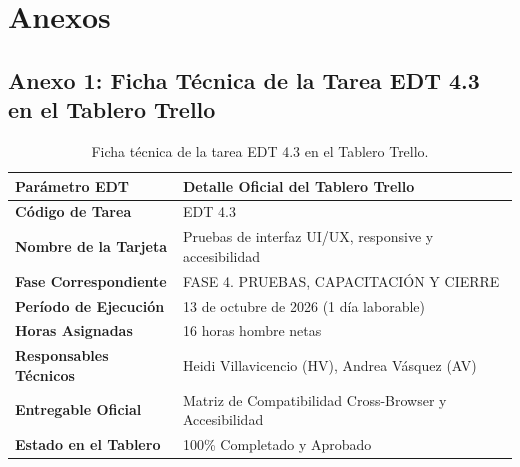 \documentclass[12pt,a4paper]{article}
\begin{document}
\vspace{0.4cm}

\section{Anexos}

\subsection*{Anexo 1: Ficha Técnica de la Tarea EDT 4.3 en el Tablero Trello}
\begin{table}[H]
\centering
\small
\renewcommand{\arraystretch}{1.2}
\begin{tabularx}{\textwidth}{|>{\bfseries}m{3.5cm}|X|}
\hline
\rowcolor{tableheader}
\textbf{Parámetro EDT} & \textbf{Detalle Oficial del Tablero Trello} \\
\hline
Código de Tarea & EDT 4.3 \\
\hline
Nombre de la Tarjeta & Pruebas de interfaz UI/UX, responsive y accesibilidad \\
\hline
Fase Correspondiente & FASE 4. PRUEBAS, CAPACITACIÓN Y CIERRE \\
\hline
Período de Ejecución & 13 de octubre de 2026 (1 día laborable) \\
\hline
Horas Asignadas & 16 horas hombre netas \\
\hline
Responsables Técnicos & Heidi Villavicencio (HV), Andrea Vásquez (AV) \\
\hline
Entregable Oficial & Matriz de Compatibilidad Cross-Browser y Accesibilidad \\
\hline
Estado en el Tablero & 100\% Completado y Aprobado \\
\hline
\end{tabularx}
\caption{Ficha técnica de la tarea EDT 4.3 en el Tablero Trello.}
\end{table}
\end{document}
